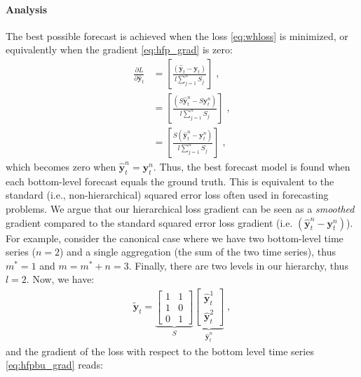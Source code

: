 \documentclass[preprint, 3p, times, twocolumn]{elsarticle}
\begin{document}
\paragraph{Analysis} The best possible forecast is achieved when the loss \eqref{eq:whloss} is minimized, or equivalently when the gradient \eqref{eq:hfp_grad} is zero:
\begin{align} 
  \frac{\partial L}{\partial \hat{\textbf{y}}_{t}} &=  \left[ \frac{(\hat{\textbf{y}}_{t} - \textbf{y}_{t})}{l \sum_{j=1}^n S_{j}} \right] \;, \nonumber \\
                                                   &=  \left[ \frac{(S \hat{\textbf{y}}^n_{t} - S \textbf{y}^n_{t})}{l \sum_{j=1}^n S_{j}} \right] \;, \nonumber \\
                                                   &=  \left[ \frac{S(\hat{\textbf{y}}^n_{t} - \textbf{y}^n_{t})}{l \sum_{j=1}^n S_{j}} \right] \;, \nonumber
\end{align}
which becomes zero when \(\hat{\textbf{y}}^n_{t} = \textbf{y}^n_{t}\). Thus, the best forecast model is found when each bottom-level forecast equals the ground truth. This is equivalent to the standard (i.e., non-hierarchical) squared error loss often used in forecasting problems. We argue that our hierarchical loss gradient can be seen as a \textit{smoothed} gradient compared to the standard squared error loss gradient (i.e. \((\hat{\textbf{y}}^n_{t} - \textbf{y}^n_{t})\)). For example, consider the canonical case where we have two bottom-level time series (\(n=2\)) and a single aggregation (the sum of the two time series), thus \(m^* = 1\) and \(m = m^* + n = 3\). Finally, there are two levels in our hierarchy, thus \(l = 2\). Now, we have:
\begin{align}
  \tilde{\textbf{y}}_{t} = \underbrace{
    \begin{bmatrix}
    1 &1 \\
    1 &0 \\
    0 &1
    \end{bmatrix}}_S 
    \underbrace{    
    \begin{bmatrix}
      \hat{\textbf{y}}^1_{t} \\
      \hat{\textbf{y}}^2_{t}
    \end{bmatrix}}_{\hat{\textbf{y}}^n_{t}} \;,
\end{align}
and the gradient of the loss with respect to the bottom level time series \eqref{eq:hfpbu_grad} reads:
\end{document}
